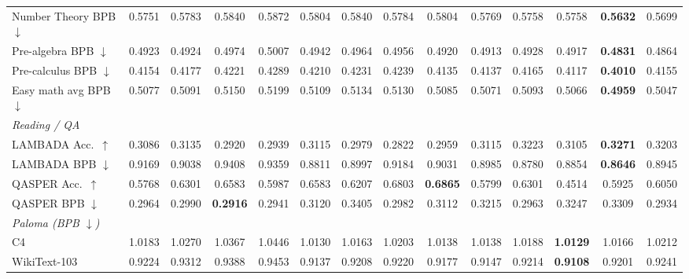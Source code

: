 \documentclass[11pt]{article}
\begin{document}
\begin{table}[t]
{\begin{tabular}{lccccccccccccc}
\quad Number Theory BPB $\downarrow$ & 0.5751 & 0.5783 & 0.5840 & 0.5872 & 0.5804 & 0.5840 & 0.5784 & 0.5804 & 0.5769 & 0.5758 & 0.5758 & \textbf{0.5632} & 0.5699 \\
\quad Pre-algebra BPB $\downarrow$ & 0.4923 & 0.4924 & 0.4974 & 0.5007 & 0.4942 & 0.4964 & 0.4956 & 0.4920 & 0.4913 & 0.4928 & 0.4917 & \textbf{0.4831} & 0.4864 \\
\quad Pre-calculus BPB $\downarrow$ & 0.4154 & 0.4177 & 0.4221 & 0.4289 & 0.4210 & 0.4231 & 0.4239 & 0.4135 & 0.4137 & 0.4165 & 0.4117 & \textbf{0.4010} & 0.4155 \\
\quad Easy math avg BPB $\downarrow$ & 0.5077 & 0.5091 & 0.5150 & 0.5199 & 0.5109 & 0.5134 & 0.5130 & 0.5085 & 0.5071 & 0.5093 & 0.5066 & \textbf{0.4959} & 0.5047 \\
\midrule
\multicolumn{14}{l}{\textit{Reading / QA}} \\
\quad LAMBADA Acc.\ $\uparrow$ & 0.3086 & 0.3135 & 0.2920 & 0.2939 & 0.3115 & 0.2979 & 0.2822 & 0.2959 & 0.3115 & 0.3223 & 0.3105 & \textbf{0.3271} & 0.3203 \\
\quad LAMBADA BPB $\downarrow$ & 0.9169 & 0.9038 & 0.9408 & 0.9359 & 0.8811 & 0.8997 & 0.9184 & 0.9031 & 0.8985 & 0.8780 & 0.8854 & \textbf{0.8646} & 0.8945 \\
\quad QASPER Acc.\ $\uparrow$ & 0.5768 & 0.6301 & 0.6583 & 0.5987 & 0.6583 & 0.6207 & 0.6803 & \textbf{0.6865} & 0.5799 & 0.6301 & 0.4514 & 0.5925 & 0.6050 \\
\quad QASPER BPB $\downarrow$ & 0.2964 & 0.2990 & \textbf{0.2916} & 0.2941 & 0.3120 & 0.3405 & 0.2982 & 0.3112 & 0.3215 & 0.2963 & 0.3247 & 0.3309 & 0.2934 \\
\midrule
\multicolumn{14}{l}{\textit{Paloma (BPB $\downarrow$)}} \\
\quad C4 & 1.0183 & 1.0270 & 1.0367 & 1.0446 & 1.0130 & 1.0163 & 1.0203 & 1.0138 & 1.0138 & 1.0188 & \textbf{1.0129} & 1.0166 & 1.0212 \\
\quad WikiText-103 & 0.9224 & 0.9312 & 0.9388 & 0.9453 & 0.9137 & 0.9208 & 0.9220 & 0.9177 & 0.9147 & 0.9214 & \textbf{0.9108} & 0.9201 & 0.9241 \\
\bottomrule
\end{tabular}%
}
\end{table}
\end{document}
